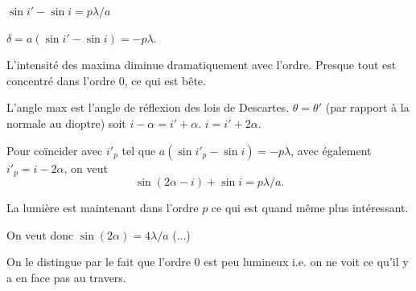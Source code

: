 \begin{solution}


\begin{questions}
\questioncours $\sin i' - \sin i = p\lambda/a$

\question $\delta = a(\sin i' - \sin i) = -p\lambda$.

L'intensité des maxima diminue dramatiquement avec l'ordre. Presque tout est concentré dans l'ordre 0, ce qui est bête.

\question L'angle max est l'angle de réflexion des lois de Descartes. $\theta = \theta'$ (par rapport à la normale au dioptre) soit $i - \alpha = i' + \alpha$. $i = i' + 2\alpha$.

\question Pour coïncider avec $i'_p$ tel que $a(\sin i'_p - \sin i) = -p\lambda$, avec également $i'_p = i - 2\alpha$, on veut $$\sin (2\alpha - i) + \sin i = p\lambda/a.$$

La lumière est maintenant dans l'ordre $p$ ce qui est quand même plus intéressant.

\question On veut donc $\sin (2\alpha) = 4\lambda/a$ (...)

On le distingue par le fait que l'ordre 0 est peu lumineux i.e. on ne voit ce qu'il y a en face pas au travers.
\end{questions}

\end{solution}






